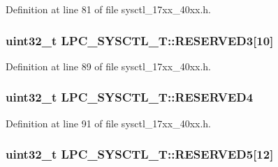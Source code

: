 Definition at line 81 of file sysctl\+\_\+17xx\+\_\+40xx.\+h.

\subsubsection[{\texorpdfstring{R\+E\+S\+E\+R\+V\+E\+D3}{RESERVED3}}]{\setlength{\rightskip}{0pt plus 5cm}uint32\+\_\+t L\+P\+C\+\_\+\+S\+Y\+S\+C\+T\+L\+\_\+\+T\+::\+R\+E\+S\+E\+R\+V\+E\+D3\mbox{[}10\mbox{]}}\hypertarget{structLPC__SYSCTL__T_a5daf9fed4694c5fdd04d46858de11e8e}{}\label{structLPC__SYSCTL__T_a5daf9fed4694c5fdd04d46858de11e8e}


Definition at line 89 of file sysctl\+\_\+17xx\+\_\+40xx.\+h.

\subsubsection[{\texorpdfstring{R\+E\+S\+E\+R\+V\+E\+D4}{RESERVED4}}]{\setlength{\rightskip}{0pt plus 5cm}uint32\+\_\+t L\+P\+C\+\_\+\+S\+Y\+S\+C\+T\+L\+\_\+\+T\+::\+R\+E\+S\+E\+R\+V\+E\+D4}\hypertarget{structLPC__SYSCTL__T_a53453664006957e4e8c6d479adcadcef}{}\label{structLPC__SYSCTL__T_a53453664006957e4e8c6d479adcadcef}


Definition at line 91 of file sysctl\+\_\+17xx\+\_\+40xx.\+h.

\subsubsection[{\texorpdfstring{R\+E\+S\+E\+R\+V\+E\+D5}{RESERVED5}}]{\setlength{\rightskip}{0pt plus 5cm}uint32\+\_\+t L\+P\+C\+\_\+\+S\+Y\+S\+C\+T\+L\+\_\+\+T\+::\+R\+E\+S\+E\+R\+V\+E\+D5\mbox{[}12\mbox{]}}\hypertarget{structLPC__SYSCTL__T_abca81e13877281a3a264db320587dd01}{}\label{structLPC__SYSCTL__T_abca81e13877281a3a264db320587dd01}


